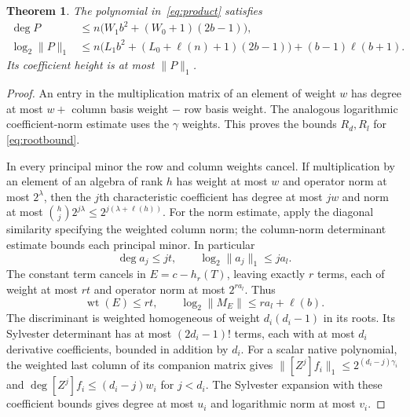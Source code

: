 \documentclass[11pt,a4paper]{article}
\newtheorem{theorem}{Theorem}[section]
\begin{document}
\begin{theorem}\label{thm:bounds}
The polynomial in~\eqref{eq:product} satisfies
\begin{align}
 \deg P&\le n\bigl(W_1b^2+(W_0+1)(2b-1)\bigr),\label{eq:degree}\\
 \log_2\|P\|_1&\le
 n\bigl(L_1b^2+(L_0+\ell(n)+1)(2b-1)\bigr)
                  +(b-1)\ell(b+1).\label{eq:height}
\end{align}
Its coefficient height is at most $\|P\|_1$.
\end{theorem}
\begin{proof}
An entry in the multiplication matrix of an element of weight $w$
has degree at most $w+$ column basis weight $-$ row basis weight.
The analogous logarithmic coefficient-norm estimate uses the
$\gamma$ weights. This proves the bounds $R_d,R_l$ for
\eqref{eq:rootbound}.

In every principal minor the row and column weights cancel.
If multiplication by an element of an algebra of rank $h$ has
weight at most $w$ and operator norm at most $2^\lambda$, then
the $j$th characteristic coefficient has degree at most $jw$
and norm at most
$\binom hj2^{j\lambda}\le2^{j(\lambda+\ell(h))}$.
For the norm estimate, apply the diagonal similarity specifying
the weighted column norm; the column-norm determinant estimate
bounds each principal minor. In particular
\[
 \deg a_j\le jt,\qquad\log_2\|a_j\|_1\le ja_l.
\]
The constant term cancels in $E=c-h_r(T)$, leaving exactly
$r$ terms, each of weight at most $rt$ and operator norm
at most $2^{ra_l}$. Thus
\[
 \operatorname{wt}(E)\le rt,\qquad
 \log_2\|M_E\|\le ra_l+\ell(b).
\]
The discriminant is weighted homogeneous of weight $d_i(d_i-1)$
in its roots. Its Sylvester determinant has at most $(2d_i-1)!$
terms, each with at most $d_i$ derivative coefficients, bounded
in addition by $d_i$. For a scalar native polynomial, the weighted
last column of its companion matrix gives
$\|[Z^j]f_i\|_1\le2^{(d_i-j)\gamma_i}$ and
$\deg[Z^j]f_i\le(d_i-j)w_i$ for $j<d_i$.
The Sylvester expansion with these coefficient bounds gives degree
at most $u_i$ and logarithmic norm at most $v_i$.


\end{proof}
\end{document}
